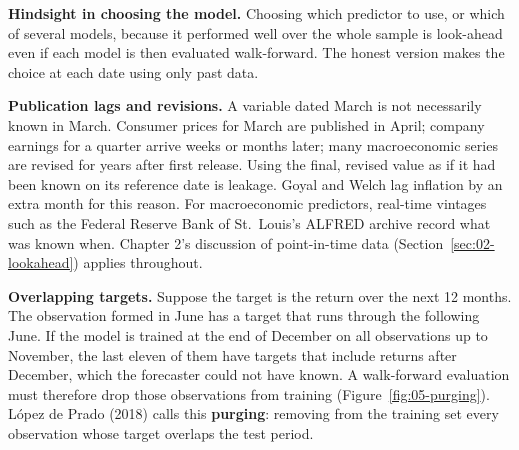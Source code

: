 \textbf{Hindsight in choosing the model.} Choosing which predictor to use, or which of several models, because it performed well over the whole sample is look-ahead even if each model is then evaluated walk-forward. The honest version makes the choice at each date using only past data.

\textbf{Publication lags and revisions.} A variable dated March is not necessarily known in March. Consumer prices for March are published in April; company earnings for a quarter arrive weeks or months later; many macroeconomic series are revised for years after first release. Using the final, revised value as if it had been known on its reference date is leakage. Goyal and Welch lag inflation by an extra month for this reason. For macroeconomic predictors, real-time vintages such as the Federal Reserve Bank of St.\ Louis's ALFRED archive record what was known when. Chapter 2's discussion of point-in-time data (Section~\ref{sec:02-lookahead}) applies throughout.

\textbf{Overlapping targets.} Suppose the target is the return over the next 12 months. The observation formed in June has a target that runs through the following June. If the model is trained at the end of December on all observations up to November, the last eleven of them have targets that include returns after December, which the forecaster could not have known. A walk-forward evaluation must therefore drop those observations from training (Figure~\ref{fig:05-purging}). L\'opez de Prado (2018) calls this \textbf{purging}: removing from the training set every observation whose target overlaps the test period.


